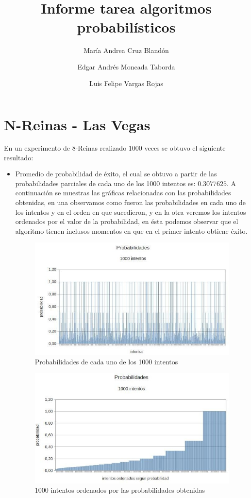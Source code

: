 \documentclass[a4paper,10pt]{article}
\title{Informe tarea algoritmos probabilísticos}
\author{María Andrea Cruz Blandón \and Edgar Andrés Moncada Taborda \and Luis Felipe Vargas Rojas}
\begin{document}
\maketitle

\section{N-Reinas - Las Vegas}

En un experimento de 8-Reinas realizado 1000 veces se obtuvo el siguiente resultado:
\begin{itemize}
 \item Promedio de probabilidad de éxito, el cual se obtuvo a partir de las probabilidades parciales de cada uno de los 1000 intentos es: $0.3077625$. A continuación se muestras las gráficas 
relacionadas con las probabilidades obtenidas, en una observamos como fueron las probabilidades en cada uno de los intentos y en el orden en que sucedieron, y en la otra veremos los intentos
ordenados por el valor de la probabilidad, en ésta podemos observar que el algoritmo tienen inclusos momentos en que en el primer intento obtiene éxito.

\begin{figure}[h]
 \centering
 \includegraphics[scale=0.5]{promedios.jpg}
 \caption{Probabilidades de cada uno de los 1000 intentos}
 \label{fig:promedios}
\end{figure}

\begin{figure}[h]
 \centering
 \includegraphics[scale=0.5]{probabilidadOrdenadas.jpg}
 \caption{1000 intentos ordenados por las probabilidades obtenidas}
 \label{fig:proOrden}
\end{figure}


\end{itemize}
\end{document}
